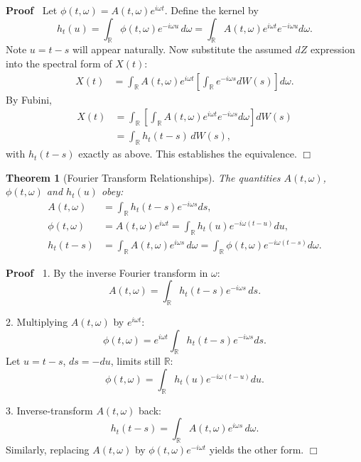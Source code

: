\documentclass{article}
\newenvironment{proof}{\noindent\textbf{Proof\ }}{\hspace*{\fill}$\Box$\medskip}
\newtheorem{theorem}{Theorem}
\begin{document}
\begin{proof}
Let $\phi(t,\omega) = A(t,\omega) e^{i\omega t}$. Define the kernel by
\[
h_t(u) = \int_{\mathbb{R}} \phi(t,\omega) e^{-i\omega u} \, d\omega
       = \int_{\mathbb{R}} A(t,\omega) e^{i\omega t} e^{-i\omega u} d\omega.
\]
Note $u = t-s$ will appear naturally. Now substitute the assumed $dZ$ expression into the spectral form of $X(t)$:
\begin{align*}
X(t) &= \int_{\mathbb{R}} A(t,\omega) e^{i\omega t} \left[ \int_{\mathbb{R}} e^{-i\omega s} dW(s) \right] d\omega.
\end{align*}
By Fubini,
\begin{align*}
X(t) &= \int_{\mathbb{R}} \left[ \int_{\mathbb{R}} A(t,\omega) e^{i\omega t} e^{-i\omega s} d\omega \right] dW(s) \\
&= \int_{\mathbb{R}} h_t(t-s) \, dW(s),
\end{align*}
with $h_t(t-s)$ exactly as above. This establishes the equivalence.
\end{proof}

\begin{theorem}
  [Fourier Transform Relationships]
  The quantities $A(t,\omega)$, $\phi(t,\omega)$ and $h_t(u)$ obey:
  \begin{align}
    A(t, \omega) &= \int_{\mathbb{R}} h_t(t - s) e^{- i \omega s} ds, \\
    \phi(t, \omega) &= A(t, \omega) e^{i \omega t} = \int_{\mathbb{R}} h_t(u) e^{- i \omega (t - u)} du, \\
    h_t(t - s) &= \int_{\mathbb{R}} A(t, \omega) e^{i \omega s} \, d\omega 
              = \int_{\mathbb{R}} \phi(t, \omega) e^{- i \omega (t - s)} d \omega.
  \end{align}
\end{theorem}

\begin{proof}
1. By the inverse Fourier transform in $\omega$:
\[
A(t,\omega) = \int_{\mathbb{R}} h_t(t-s) e^{-i\omega s} \, ds.
\]

2. Multiplying $A(t,\omega)$ by $e^{i\omega t}$:
\[
\phi(t,\omega) = e^{i\omega t} \int_{\mathbb{R}} h_t(t-s) e^{-i\omega s} ds.
\]
Let $u = t-s$, $ds = -du$, limits still $\mathbb{R}$:
\[
\phi(t,\omega) = \int_{\mathbb{R}} h_t(u) e^{-i\omega (t-u)} du.
\]

3. Inverse-transform $A(t,\omega)$ back:
\[
h_t(t-s) = \int_{\mathbb{R}} A(t,\omega) e^{i\omega s} \, d\omega.
\]
Similarly, replacing $A(t,\omega)$ by $\phi(t,\omega)e^{-i\omega t}$ yields the other form.
\end{proof}
\end{document}
